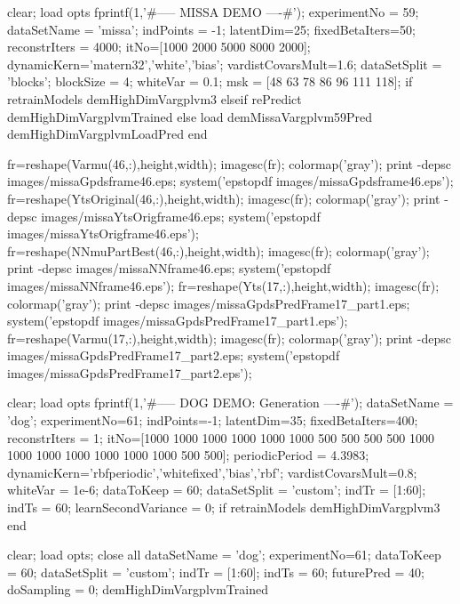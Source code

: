 \documentclass{article} %
\newenvironment{matlab}{\comment}{\endcomment}
\begin{document}
\begin{matlab}
clear; load opts
fprintf(1,'\n\n#-----  MISSA DEMO ----#\n');
experimentNo = 59;
dataSetName = 'missa';
indPoints = -1; latentDim=25;
fixedBetaIters=50; reconstrIters = 4000;
itNo=[1000 2000 5000 8000 2000]; %
dynamicKern={'matern32','white','bias'};
vardistCovarsMult=1.6;
dataSetSplit = 'blocks';
blockSize = 4; whiteVar = 0.1;
msk = [48 63 78 86 96 111 118];
if retrainModels
    demHighDimVargplvm3
elseif rePredict
    demHighDimVargplvmTrained
else
    load demMissaVargplvm59Pred
    demHighDimVargplvmLoadPred
end

fr=reshape(Varmu(46,:),height,width); imagesc(fr); colormap('gray'); %
print -depsc images/missaGpdsframe46.eps; system('epstopdf images/missaGpdsframe46.eps');
fr=reshape(YtsOriginal(46,:),height,width); imagesc(fr); colormap('gray'); %
print -depsc images/missaYtsOrigframe46.eps; system('epstopdf images/missaYtsOrigframe46.eps');
fr=reshape(NNmuPartBest(46,:),height,width); imagesc(fr); colormap('gray'); %
print -depsc images/missaNNframe46.eps; system('epstopdf images/missaNNframe46.eps');
fr=reshape(Yts(17,:),height,width); imagesc(fr); colormap('gray'); 
print -depsc images/missaGpdsPredFrame17_part1.eps; system('epstopdf images/missaGpdsPredFrame17_part1.eps');
fr=reshape(Varmu(17,:),height,width); imagesc(fr); colormap('gray');
print -depsc images/missaGpdsPredFrame17_part2.eps; system('epstopdf images/missaGpdsPredFrame17_part2.eps');



clear; load opts
fprintf(1,'\n\n#-----  DOG DEMO: Generation ----#\n');
dataSetName = 'dog';
experimentNo=61;
indPoints=-1; latentDim=35;
fixedBetaIters=400;
reconstrIters = 1; %
itNo=[1000 1000 1000 1000 1000 1000 500 500 500 500 1000 1000 1000 1000 1000 1000 1000 500 500]; %
periodicPeriod = 4.3983; %
dynamicKern={'rbfperiodic','whitefixed','bias','rbf'};
vardistCovarsMult=0.8;
whiteVar = 1e-6;
dataToKeep = 60; dataSetSplit = 'custom';
indTr = [1:60];
indTs = 60; %
learnSecondVariance = 0;
if retrainModels
    demHighDimVargplvm3
end

clear; load opts; close all 
dataSetName = 'dog'; 
experimentNo=61; dataToKeep = 60; dataSetSplit = 'custom';
indTr = [1:60]; indTs = 60;
futurePred = 40; doSampling = 0; demHighDimVargplvmTrained


\end{matlab}
\end{document}
